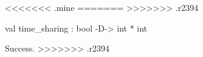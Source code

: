<<<<<<< .mine
\chklistingfalse
=======
\chklistingtrue
>>>>>>> .r2394
\begin{ChkListingMsg}
val time_sharing : bool -D-> int * int 
\end{ChkListingMsg}
\begin{ChkListingErr}
Success.
>>>>>>> .r2394
\end{ChkListingErr}
